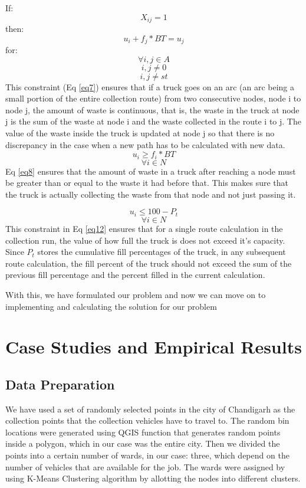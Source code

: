 \documentclass[12pt]{article}
\begin{document}
If:
$$ X_{ij}=1$$
then:
\begin{equation}\label{eq7}
    u_i+f_j*BT =u_j
\end{equation}
for: 
$$ \forall i,j \in A$$
$$ i,j\ne 0$$
$$ i,j \ne st $$
This constraint (Eq \eqref{eq7}) ensures that if a truck goes on an arc (an arc being a small portion of the entire collection route) from two consecutive nodes, node i to node j, the amount of waste is continuous, that is, the waste in the truck at node j is the sum of the waste at node i and the waste collected in the route i to j. The value of the waste inside the truck is updated at node j so that there is no discrepancy in the case when a new path has to be calculated with new data.
\begin{equation}\label{eq8}
    u_i\ge f_i*BT
\end{equation}
$$  \forall i\in N$$
Eq \eqref{eq8} ensures that the amount of waste in a truck after reaching a node must be greater than or equal to the waste it had before that. This makes sure that the truck is actually collecting the waste from that node and not just passing it.

\begin{equation}\label{eq12}
    u_i\le 100 - P_t
\end{equation}
$$\forall i \in N $$
This constraint in Eq \eqref{eq12} ensures that for a single route calculation in the collection run, the value of how full the truck is does not exceed it's capacity. Since $P_t$ stores the cumulative fill percentages of the truck, in any subsequent route calculation, the fill percent of the truck should not exceed the sum of the previous fill percentage and the percent filled in the current calculation. 

With this, we have formulated our problem and now we can move on to implementing and calculating the solution for our problem

\section{Case Studies and Empirical Results}

\subsection{Data Preparation}

We have used a set of randomly selected points in the city of Chandigarh as the collection points that the collection vehicles have to travel to. The random bin locations were generated using QGIS function that generates random points inside a polygon, which in our case was the entire city. Then we divided the points into a certain number of wards, in our case: three, which depend on the number of vehicles that are available for the job. The wards were assigned by using K-Means Clustering algorithm by allotting the nodes into different clusters.
\end{document}
